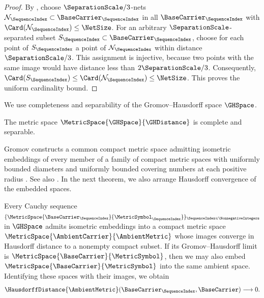 \begin{proof}
By ,
choose
$\SeparationScale/3$-nets
$\mathcal{N}_\SequenceIndex\subset\BaseCarrier_\SequenceIndex$
in all
$\BaseCarrier_\SequenceIndex$
with
$\Card(\mathcal{N}_\SequenceIndex)\leq\NetSize$.
For an arbitrary
$\SeparationScale$-separated subset
$S_\SequenceIndex\subset\BaseCarrier_\SequenceIndex$,
choose for each point of
$S_\SequenceIndex$
a point of
$\mathcal{N}_\SequenceIndex$
within distance
$\SeparationScale/3$.
This assignment is injective,
because two points with the same image would have distance less than
$2\SeparationScale/3$.
Consequently,
$\Card(S_\SequenceIndex)
 \leq \Card(\mathcal{N}_\SequenceIndex)\leq \NetSize$.
This proves the uniform cardinality bound.
\end{proof}

We use completeness and separability of the Gromov--Hausdorff space
$\GHSpace$.

\begin{theorem}\label{lem:gh-basics}
The metric space
$\MetricSpace{\GHSpace}{\GHDistance}$
is complete and separable.
\end{theorem}

Gromov constructs a common compact metric space admitting isometric embeddings
of every member of a family of compact metric spaces with uniformly bounded
diameters and uniformly bounded covering numbers at each positive radius
\cite[Section~6, pp.~64--65]{Gromov1981}.
See also \cite[arXiv v1, Theorem~7.19]{Tuzhilin2020}.
In the next theorem,
we also arrange Hausdorff convergence of the embedded spaces.

\begin{theorem}\label{lem:common-gh-embedding}
Every Cauchy sequence
$\{\MetricSpace{\BaseCarrier_\SequenceIndex}{\MetricSymbol_\SequenceIndex}\}_{\SequenceIndex\in\NonnegativeIntegers}$
in
$\GHSpace$
admits isometric embeddings into a compact metric space
$\MetricSpace{\AmbientCarrier}{\AmbientMetric}$
whose images converge in Hausdorff distance to a nonempty compact subset.
If its Gromov--Hausdorff limit is
$\MetricSpace{\BaseCarrier}{\MetricSymbol}$,
then we may also embed
$\MetricSpace{\BaseCarrier}{\MetricSymbol}$
into the same ambient space.
Identifying these spaces with their images, we obtain
\[
 \HausdorffDistance{\AmbientMetric}(\BaseCarrier_\SequenceIndex,\BaseCarrier)\longrightarrow0.
\]
\end{theorem}

